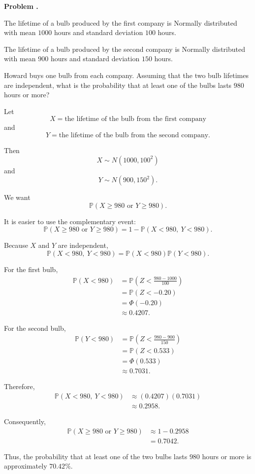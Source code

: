 \documentclass[11pt]{article}
\newcounter{problem}
\newenvironment{problem}[1][]{
    \refstepcounter{problem}
    \begin{problemheader}
        \textbf{Problem \theproblem%
        \if\relax\detokenize{#1}\relax
        \else. #1%
        \fi}
    \end{problemheader}
}{
    \vspace{0.5em}
}
\newenvironment{solution}{
    \par
    \begin{tcolorbox}[
        colback=white,
        colframe=uwgold,
        boxrule=0.7pt,
        arc=2mm,
        left=3mm,
        right=3mm,
        top=2mm,
        bottom=2mm,
        breakable,
        before skip=0.5em,
        after skip=1em,
        title=\textbf{Solution},
        coltitle=uwpurple,
        fonttitle=\bfseries
    ]
}{
    \end{tcolorbox}
}
\begin{document}
\newpage
\begin{problem}

The lifetime of a bulb produced by the first company is Normally distributed
with mean \(1000\) hours and standard deviation \(100\) hours.

The lifetime of a bulb produced by the second company is Normally distributed
with mean \(900\) hours and standard deviation \(150\) hours.

Howard buys one bulb from each company. Assuming that the two bulb lifetimes
are independent, what is the probability that at least one of the bulbs lasts
\(980\) hours or more?

\end{problem}

\begin{solution}

Let
\[
X=\text{the lifetime of the bulb from the first company}
\]
and
\[
Y=\text{the lifetime of the bulb from the second company}.
\]

Then
\[
X\sim N(1000,100^2)
\]
and
\[
Y\sim N(900,150^2).
\]

We want
\[
\mathbb{P}(X\geq980\text{ or }Y\geq980).
\]

It is easier to use the complementary event:
\[
\mathbb{P}(X\geq980\text{ or }Y\geq980)
=
1-\mathbb{P}(X<980,\ Y<980).
\]

Because \(X\) and \(Y\) are independent,
\[
\mathbb{P}(X<980,\ Y<980)
=
\mathbb{P}(X<980)\mathbb{P}(Y<980).
\]

For the first bulb,
\[
\begin{aligned}
\mathbb{P}(X<980)
&=
\mathbb{P}\left(
Z<
\frac{980-1000}{100}
\right)\\
&=
\mathbb{P}(Z<-0.20)\\
&=
\Phi(-0.20)\\
&\approx0.4207.
\end{aligned}
\]

For the second bulb,
\[
\begin{aligned}
\mathbb{P}(Y<980)
&=
\mathbb{P}\left(
Z<
\frac{980-900}{150}
\right)\\
&=
\mathbb{P}(Z<0.533)\\
&=
\Phi(0.533)\\
&\approx0.7031.
\end{aligned}
\]

Therefore,
\[
\begin{aligned}
\mathbb{P}(X<980,\ Y<980)
&\approx
(0.4207)(0.7031)\\
&\approx
0.2958.
\end{aligned}
\]

Consequently,
\[
\begin{aligned}
\mathbb{P}(X\geq980\text{ or }Y\geq980)
&\approx
1-0.2958\\
&=
 {0.7042}.
\end{aligned}
\]

Thus, the probability that at least one of the two bulbs lasts \(980\) hours
or more is approximately \(70.42\%\).

\end{solution}
\end{document}
